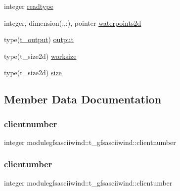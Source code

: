 \begin{DoxyCompactItemize}
\item 
integer \mbox{\hyperlink{structmodulegfsasciiwind_1_1t__gfsasciiwind_ab75a87c6d62e264b66c9b4f76fc58605}{readtype}}
\item 
integer, dimension(\+:,\+:), pointer \mbox{\hyperlink{structmodulegfsasciiwind_1_1t__gfsasciiwind_aaa14f8c97e64b145db06385fb9a23720}{waterpoints2d}}
\item 
type(\mbox{\hyperlink{structmodulegfsasciiwind_1_1t__output}{t\+\_\+output}}) \mbox{\hyperlink{structmodulegfsasciiwind_1_1t__gfsasciiwind_a9e323d07f058c0114369130330dc211a}{output}}
\item 
type(t\+\_\+size2d) \mbox{\hyperlink{structmodulegfsasciiwind_1_1t__gfsasciiwind_aa38d66840f358e5cd1dcfc74d4adc76f}{worksize}}
\item 
type(t\+\_\+size2d) \mbox{\hyperlink{structmodulegfsasciiwind_1_1t__gfsasciiwind_a99d9df96164eab409ee01e04aeb47680}{size}}
\end{DoxyCompactItemize}


\subsection{Member Data Documentation}
\mbox{\label{structmodulegfsasciiwind_1_1t__gfsasciiwind_ae8dc6c932a04750b0c6cc73dacd5230c}} 
\subsubsection{\texorpdfstring{clientnumber}{clientnumber}}
{\footnotesize\ttfamily integer modulegfsasciiwind\+::t\+\_\+gfsasciiwind\+::clientnumber\hspace{0.3cm}{\ttfamily [private]}}

\mbox{\label{structmodulegfsasciiwind_1_1t__gfsasciiwind_a2f1f006eb7d6fd18b64cc2e529dbd43e}} 
\subsubsection{\texorpdfstring{clientumber}{clientumber}}
{\footnotesize\ttfamily integer modulegfsasciiwind\+::t\+\_\+gfsasciiwind\+::clientumber\hspace{0.3cm}{\ttfamily [private]}}

